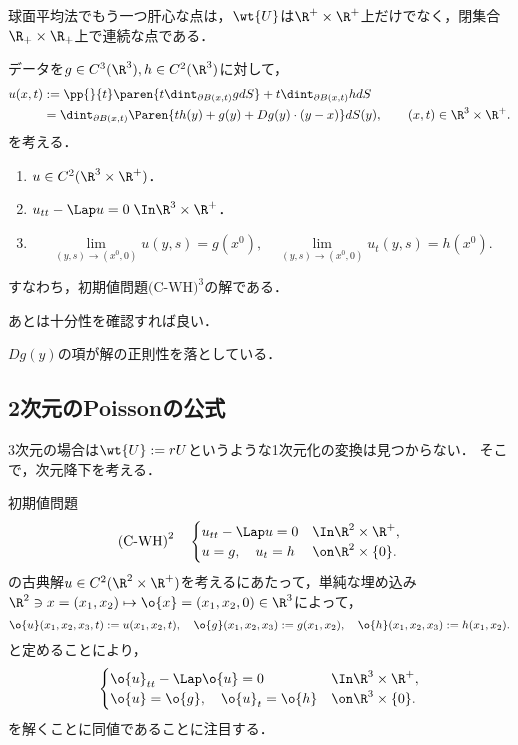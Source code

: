 \documentclass[uplatex,dvipdfmx]{jsreport}
\begin{document}
\begin{remarks}
    球面平均法でもう一つ肝心な点は，$\wt{U}$は$\R^+\times\R^+$上だけでなく，閉集合$\R_+\times\R_+$上で連続な点である．
\end{remarks}

\begin{theorem}\label{thm-Kirchhoff-formula}
    データを$g\in C^3(\R^3),h\in C^2(\R^3)$に対して，
    \begin{align*}
        u(x,t)&:=\pp{}{t}\paren{t\dint_{\partial B(x,t)}gdS}+t\dint_{\partial B(x,t)}hdS\\
        &=\dint_{\partial B(x,t)}\Paren{th(y)+g(y)+Dg(y)\cdot(y-x)}dS(y),\qquad (x,t)\in\R^3\times\R^+.
    \end{align*}
    を考える．
    \begin{enumerate}
        \item $u\in C^2(\R^3\times\R^+)$．
        \item $u_{tt}-\Lap u=0\;\In\R^3\times\R^+$．
        \item \[\lim_{(y,s)\to(x^0,0)}u(y,s)=g(x^0),\quad\lim_{(y,s)\to(x^0,0)}u_t(y,s)=h(x^0).\]
    \end{enumerate}
    すなわち，初期値問題$\text{(C-WH)}^3$の解である．
\end{theorem}
\begin{Proof}
    あとは十分性を確認すれば良い．
\end{Proof}
\begin{remarks}
    $Dg(y)$の項が解の正則性を落としている．
\end{remarks}

\subsection{2次元のPoissonの公式}

\begin{tcolorbox}[colframe=ForestGreen, colback=ForestGreen!10!white,breakable,colbacktitle=ForestGreen!40!white,coltitle=black,fonttitle=\bfseries\sffamily,
title=]
    3次元の場合は$\wt{U}:=rU$というような1次元化の変換は見つからない．
    そこで，次元降下を考える．
\end{tcolorbox}

\begin{problem}
    初期値問題
    \[\text{(C-WH)}^{2}\quad\begin{cases}
        u_{tt}-\Lap u=0&\In\R^2\times\R^+,\\
        u=g,\quad u_t=h&\on\R^2\times\{0\}.
    \end{cases}\]
    の古典解$u\in C^2(\R^2\times\R^+)$を考えるにあたって，単純な埋め込み$\R^2\ni x=(x_1,x_2)\mapsto\o{x}=(x_1,x_2,0)\in\R^3$によって，
    \[\o{u}(x_1,x_2,x_3,t):=u(x_1,x_2,t),\quad\o{g}(x_1,x_2,x_3):=g(x_1,x_2),\quad\o{h}(x_1,x_2,x_3):=h(x_1,x_2).\]
    と定めることにより，
    \[\begin{cases}
        \o{u}_{tt}-\Lap\o{u}=0&\In\R^3\times\R^+,\\
        \o{u}=\o{g},\quad\o{u}_t=\o{h}&\on\R^3\times\{0\}.
    \end{cases}\]
    を解くことに同値であることに注目する．
\end{problem}
\end{document}
